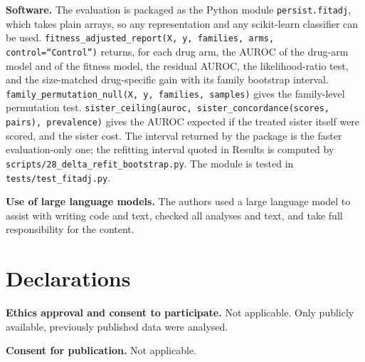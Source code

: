 \documentclass[11pt,a4paper]{article}
\begin{document}
\textbf{Software.} The evaluation is packaged as the Python module \texttt{persist.fitadj}, which takes plain arrays, so any representation and any scikit-learn classifier can be used. \texttt{fitness\_adjusted\_report(X, y, families, arms, control=``Control'')} returns, for each drug arm, the AUROC of the drug-arm model and of the fitness model, the residual AUROC, the likelihood-ratio test, and the size-matched drug-specific gain with its family bootstrap interval. \texttt{family\_permutation\_null(X, y, families, samples)} gives the family-level permutation test. \texttt{sister\_ceiling(auroc, sister\_concordance(scores, pairs), prevalence)} gives the AUROC expected if the treated sister itself were scored, and the sister cost. The interval returned by the package is the faster evaluation-only one; the refitting interval quoted in Results is computed by \texttt{scripts/28\_delta\_refit\_bootstrap.py}. The module is tested in \texttt{tests/test\_fitadj.py}.

\textbf{Use of large language models.} The authors used a large language model to assist with writing code and text, checked all analyses and text, and take full responsibility for the content.

\section*{Declarations}

\textbf{Ethics approval and consent to participate.} Not applicable. Only publicly available, previously published data were analysed.

\textbf{Consent for publication.} Not applicable.
\end{document}
